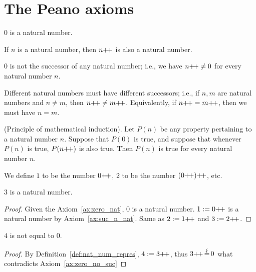 \section{The Peano axioms}


\begin{axiom}
    $0$ is a natural number.\label{ax:zero_nat}
\end{axiom}

\begin{axiom}
    If $n$ is a natural number, then $n\operatorname{\!+\!+}$ is also a natural number.\label{ax:suc_n_nat}
\end{axiom}

\begin{axiom}
 $0$ is not the successor of any natural number; i.e., we have $n\operatorname{\!+\!+}\neq 0$ for every natural number $n$.\label{ax:zero_no_suc}
\end{axiom}

\begin{axiom}
    Different natural numbers must have different successors; i.e., if $n, m$ are natural numbers and $n\neq m$, then $n\operatorname{\!+\!+}\neq m\operatorname{\!+\!+}$. Equivalently, if $n\operatorname{\!+\!+}=m\operatorname{\!+\!+}$, then we must have $n=m$.\label{ax:nat_diff_succ}
\end{axiom}

\begin{axiom}
    \textup{(Principle of mathematical induction)}. Let $P(n)$ be any property pertaining to a natural number $n$. Suppose that $P(0)$ is true, and suppose that whenever $P(n)$ is true, $P(n\operatorname{\!+\!+})$ is also true. Then $P(n)$ is true for every natural number $n$.\label{ax:induc}
\end{axiom}

\begin{definition}
    We define $1$ to be the number $0\operatorname{\!+\!+}$, $2$ to be the number $(0\operatorname{\!+\!+})\operatorname{\!+\!+}$, etc.\label{def:nat_num_repres}
\end{definition}

\pagebreak
\begin{proposition}
    $3$ is a natural number.
\end{proposition}
\begin{proof}
    Given the Axiom~\ref{ax:zero_nat}, $0$ is a natural number. $1:=0\operatorname{\!+\!+}$ is a natural number by Axiom~\ref{ax:suc_n_nat}. Same as $2:=1\operatorname{\!+\!+}$ and $3:=2\operatorname{\!+\!+}$.
\end{proof}

\begin{proposition}
    $4$ is not equal to $0$.\label{prop:4-not-0}
\end{proposition}
\begin{proof}
    By Definition~\ref{def:nat_num_repres}, $4:=3\operatorname{\!+\!+}$, thus $3\operatorname{\!+\!+}\operatorname{\stackrel{\lightning}{=}}0$ what contradicts Axiom~\ref{ax:zero_no_suc}
\end{proof}

